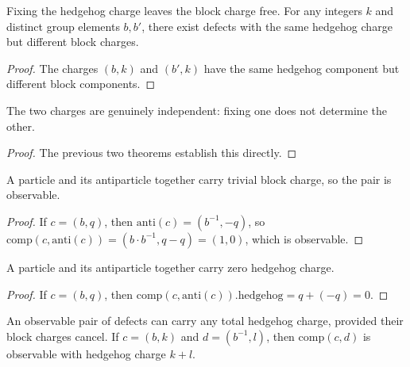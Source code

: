 \begin{theorem}
Fixing the hedgehog charge leaves the block charge free. For any integers $k$ and distinct group elements $b, b'$, there exist defects with the same hedgehog charge but different block charges.
\end{theorem}

\begin{proof}
The charges $(b, k)$ and $(b', k)$ have the same hedgehog component but different block components.
\end{proof}

\begin{theorem}
The two charges are genuinely independent: fixing one does not determine the other.
\end{theorem}

\begin{proof}
The previous two theorems establish this directly.
\end{proof}

\begin{theorem}
A particle and its antiparticle together carry trivial block charge, so the pair is observable.
\end{theorem}

\begin{proof}
If $c = (b, q)$, then $\mathrm{anti}(c) = (b^{-1}, -q)$, so $\mathrm{comp}(c, \mathrm{anti}(c)) = (b \cdot b^{-1}, q - q) = (1, 0)$, which is observable.
\end{proof}

\begin{theorem}
A particle and its antiparticle together carry zero hedgehog charge.
\end{theorem}

\begin{proof}
If $c = (b, q)$, then $\mathrm{comp}(c, \mathrm{anti}(c)).\mathrm{hedgehog} = q + (-q) = 0$.
\end{proof}

\begin{theorem}
An observable pair of defects can carry any total hedgehog charge, provided their block charges cancel. If $c = (b, k)$ and $d = (b^{-1}, l)$, then $\mathrm{comp}(c, d)$ is observable with hedgehog charge $k + l$.
\end{theorem}

